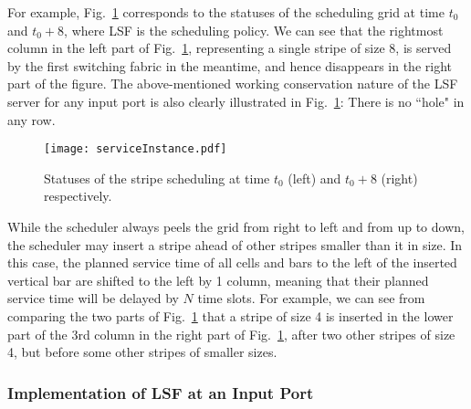For example, Fig.~\ref{fig: instance}
corresponds to the statuses of the scheduling grid at time $t_0$ and $t_0 + 8$, 
where LSF is the scheduling policy.  We can see that
the rightmost
column 
in the left part of Fig.~\ref{fig: instance}, representing a single stripe of size $8$, 
is served by the first switching fabric in the meantime, 
and hence disappears in the right part of the figure.  
The above-mentioned working conservation nature of the LSF server for any input port is
also clearly illustrated in Fig.~\ref{fig: instance}:  
There is no ``hole" in any row.  

\begin{figure}[htb]
  \centering
    \texttt{[image: serviceInstance.pdf]}
    \caption{Statuses of the stripe scheduling at time $t_0$ (left) and $t_0+8$ (right) respectively.}
\label{fig: instance}
\end{figure}	 














While the scheduler always peels the grid from right to left and from up to down, 
the scheduler may insert a stripe ahead of other stripes smaller than it in size.  
In this case, the planned service time of all cells and bars to the left of the inserted vertical bar 
are shifted to the left by 1 column, meaning that their planned service time will 
be delayed by $N$ time slots.
For example, we 
can see from comparing the two parts of Fig.~\ref{fig: instance}
that a stripe of size 4 is inserted in the lower part of the 
3rd column in the right part of Fig.~\ref{fig: instance}, 
after two other stripes of size 4, but before some other stripes of smaller sizes.




















\subsubsection{Implementation of LSF at an Input Port}
\label{subsec:data strucutre lsf}

